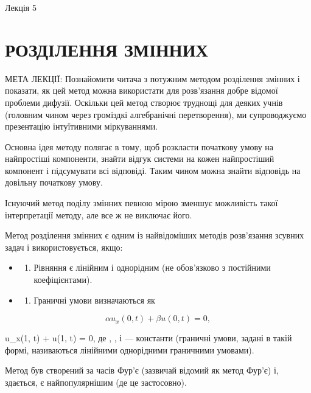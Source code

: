 \documentclass[
  ukrainian,
]{article}
\providecommand{\tightlist}{%
  \setlength{\itemsep}{0pt}\setlength{\parskip}{0pt}}
\begin{document}
Лекція 5

\section{РОЗДІЛЕННЯ
ЗМІННИХ}\label{ux440ux43eux437ux434ux456ux43bux435ux43dux43dux44f-ux437ux43cux456ux43dux43dux438ux445}

МЕТА ЛЕКЦІЇ: Познайомити читача з потужним методом розділення змінних і
показати, як цей метод можна використати для розв'язання добре відомої
проблеми дифузії. Оскільки цей метод створює труднощі для деяких учнів
(головним чином через громіздкі алгебранічні перетворення), ми
супроводжуємо презентацію інтуїтивними міркуваннями.

Основна ідея методу полягає в тому, щоб розкласти початкову умову на
найпростіші компоненти, знайти відгук системи на кожен найпростіший
компонент і підсумувати всі відповіді. Таким чином можна знайти
відповідь на довільну початкову умову.

Існуючий метод поділу змінних певною мірою зменшує можливість такої
інтерпретації методу, але все ж не виключає його.

Метод розділення змінних є одним із найвідоміших методів розв'язання
зсувних задач і використовується, якщо:

\begin{itemize}
\tightlist
\item
  \begin{enumerate}
  \def\labelenumi{\arabic{enumi}.}
  \tightlist
  \item
    Рівняння є лінійним і однорідним (не обов'язково з постійними
    коефіцієнтами).
  \end{enumerate}
\item
  \begin{enumerate}
  \def\labelenumi{\arabic{enumi}.}
  \setcounter{enumi}{1}
  \tightlist
  \item
    Граничні умови визначаються як
  \end{enumerate}
\end{itemize}

\[
\alpha u_x(0, t) + \beta u(0, t) = 0,
\]

\gamma u\_x(1, t) + \delta u(1, t) = 0, де \alpha , \beta , \gamma і
\delta --- константи (граничні умови, задані в такій формі, називаються
лінійними однорідними граничними умовами).

Метод був створений за часів Фур'є (зазвичай відомий як метод Фур'є) і,
здається, є найпопулярнішим (де це застосовно).
\end{document}
